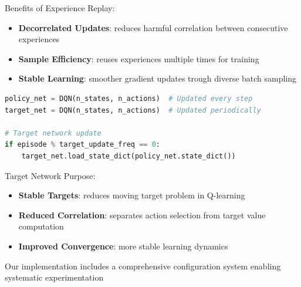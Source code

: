 \documentclass[a4paper,12pt]{article}
\begin{document}
Benefits of Experience Replay:
\begin{itemize}
    \item \textbf{Decorrelated Updates}: reduces harmful correlation between consecutive experiences 
    \item \textbf{Sample Efficiency}: reuses experiences multiple times for training
    \item \textbf{Stable Learning}: smoother gradient updates trough diverse batch sampling
\end{itemize}
\begin{lstlisting}[language=Python]
policy_net = DQN(n_states, n_actions)  # Updated every step
target_net = DQN(n_states, n_actions)  # Updated periodically

# Target network update
if episode % target_update_freq == 0:
    target_net.load_state_dict(policy_net.state_dict())
\end{lstlisting}
Target Network Purpose:
\begin{itemize}
    \item \textbf{Stable Targets}: reduces moving target problem in Q-learning
    \item \textbf{Reduced Correlation}: separates action selection from target value computation
    \item \textbf{Improved Convergence}: more stable learning dynamics
\end{itemize}
Our implementation includes a comprehensive configuration system enabling systematic experimentation
\end{document}
